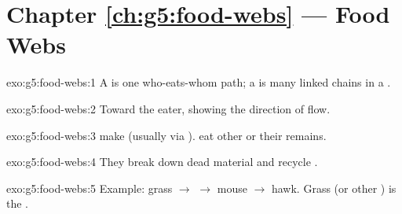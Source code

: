 \section*{Chapter \ref{ch:g5:food-webs} --- Food Webs}

\begin{solution}{exo:g5:food-webs:1}
A  is one who-eats-whom path; a  is many linked chains
in a .
\end{solution}

\begin{solution}{exo:g5:food-webs:2}
Toward the eater, showing the direction of  flow.
\end{solution}

\begin{solution}{exo:g5:food-webs:3}
 make  (usually via ).  eat other 
or their remains.
\end{solution}

\begin{solution}{exo:g5:food-webs:4}
They break down dead material and recycle .
\end{solution}

\begin{solution}{exo:g5:food-webs:5}
Example: grass $\to$  $\to$ mouse $\to$ hawk. Grass (or other
) is the .
\end{solution}

